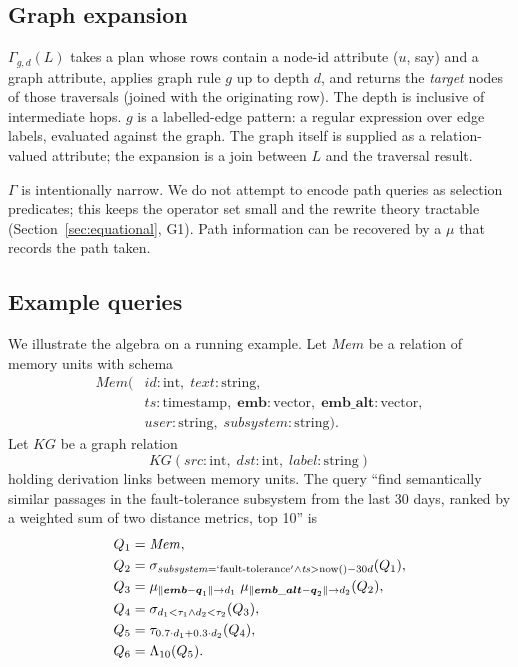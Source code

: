 \documentclass[sigconf,nonacm,review]{acmart}
\theoremstyle{plain}
\theoremstyle{definition}
\newcommand{\vect}[1]{\boldsymbol{#1}}
\newcommand{\Mem}{\mathit{Mem}}
\newcommand{\KG}{\mathit{KG}}
\theoremstyle{remark}
\begin{document}
\subsection{Graph expansion}

$\Gamma_{g,d}(L)$ takes a plan whose rows contain a node-id attribute
($u$, say) and a graph attribute, applies graph rule $g$ up to depth
$d$, and returns the \emph{target} nodes of those traversals (joined
with the originating row). The depth is inclusive of intermediate
hops. $g$ is a labelled-edge pattern: a regular expression over edge
labels, evaluated against the graph. The graph itself is supplied as
a relation-valued attribute; the expansion is a join between $L$ and
the traversal result.

$\Gamma$ is intentionally narrow. We do not attempt to encode path
queries as selection predicates; this keeps the operator set small
and the rewrite theory tractable (Section~\ref{sec:equational}, G1).
Path information can be recovered by a $\mu$ that records the path
taken.

\subsection{Example queries}

We illustrate the algebra on a running example. Let $\Mem$ be a
relation of memory units with schema
\[
\begin{aligned}
\Mem(&\mathit{id}: \mathrm{int},\; \mathit{text}: \mathrm{string}, \\
     &\mathit{ts}: \mathrm{timestamp},\;
       \vect{emb}: \mathrm{vector},\;
       \vect{emb\_alt}: \mathrm{vector}, \\
     &\mathit{user}: \mathrm{string},\;
       \mathit{subsystem}: \mathrm{string}).
\end{aligned}
\]
Let $\KG$ be a graph relation
\[
\KG(\mathit{src}: \mathrm{int},\; \mathit{dst}: \mathrm{int},\;
    \mathit{label}: \mathrm{string})
\]
holding derivation links between memory units. The query ``find
semantically similar passages in the fault-tolerance subsystem from
the last 30 days, ranked by a weighted sum of two distance metrics,
top 10'' is
\begin{align*}
Q_1 &= \Mem, \\
Q_2 &= \sigma_{\mathit{subsystem} = \mathrm{`fault\text{-}tolerance'} \wedge \mathit{ts} > \mathrm{now}() - 30d}(Q_1), \\
Q_3 &= \mu_{\lVert\vect{emb} - \vect{q}_1\rVert \to d_1}\;
        \mu_{\lVert\vect{emb\_alt} - \vect{q}_2\rVert \to d_2}(Q_2), \\
Q_4 &= \sigma_{d_1 < \tau_1 \wedge d_2 < \tau_2}(Q_3), \\
Q_5 &= \tau_{0.7\cdot d_1 + 0.3\cdot d_2}(Q_4), \\
Q_6 &= \Lambda_{10}(Q_5).
\end{align*}
\end{document}

